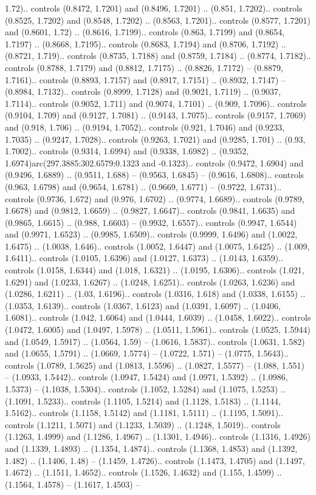 1.72).. controls (0.8472, 1.7201) and (0.8496, 1.7201) .. (0.851, 1.7202).. controls (0.8525, 1.7202) and (0.8548, 1.7202) .. (0.8563, 1.7201).. controls (0.8577, 1.7201) and (0.8601, 1.72) .. (0.8616, 1.7199).. controls (0.863, 1.7199) and (0.8654, 1.7197) .. (0.8668, 1.7195).. controls (0.8683, 1.7194) and (0.8706, 1.7192) .. (0.8721, 1.719).. controls (0.8735, 1.7188) and (0.8759, 1.7184) .. (0.8774, 1.7182).. controls (0.8788, 1.7179) and (0.8812, 1.7175) .. (0.8826, 1.7172) -- (0.8879, 1.7161).. controls (0.8893, 1.7157) and (0.8917, 1.7151) .. (0.8932, 1.7147) -- (0.8984, 1.7132).. controls (0.8999, 1.7128) and (0.9021, 1.7119) .. (0.9037, 1.7114).. controls (0.9052, 1.711) and (0.9074, 1.7101) .. (0.909, 1.7096).. controls (0.9104, 1.709) and (0.9127, 1.7081) .. (0.9143, 1.7075).. controls (0.9157, 1.7069) and (0.918, 1.706) .. (0.9194, 1.7052).. controls (0.921, 1.7046) and (0.9233, 1.7035) .. (0.9247, 1.7028).. controls (0.9263, 1.7021) and (0.9285, 1.701) .. (0.93, 1.7002).. controls (0.9314, 1.6994) and (0.9338, 1.6982) .. (0.9352, 1.6974)arc(297.3885:302.6579:0.1323 and -0.1323).. controls (0.9472, 1.6904) and (0.9496, 1.6889) .. (0.9511, 1.688) -- (0.9563, 1.6845) -- (0.9616, 1.6808).. controls (0.963, 1.6798) and (0.9654, 1.6781) .. (0.9669, 1.6771) -- (0.9722, 1.6731).. controls (0.9736, 1.672) and (0.976, 1.6702) .. (0.9774, 1.6689).. controls (0.9789, 1.6678) and (0.9812, 1.6659) .. (0.9827, 1.6647).. controls (0.9841, 1.6635) and (0.9865, 1.6615) .. (0.988, 1.6603) -- (0.9932, 1.6557).. controls (0.9947, 1.6544) and (0.9971, 1.6523) .. (0.9985, 1.6509).. controls (0.9999, 1.6496) and (1.0022, 1.6475) .. (1.0038, 1.646).. controls (1.0052, 1.6447) and (1.0075, 1.6425) .. (1.009, 1.6411).. controls (1.0105, 1.6396) and (1.0127, 1.6373) .. (1.0143, 1.6359).. controls (1.0158, 1.6344) and (1.018, 1.6321) .. (1.0195, 1.6306).. controls (1.021, 1.6291) and (1.0233, 1.6267) .. (1.0248, 1.6251).. controls (1.0263, 1.6236) and (1.0286, 1.6211) .. (1.03, 1.6196).. controls (1.0316, 1.618) and (1.0338, 1.6155) .. (1.0353, 1.6139).. controls (1.0367, 1.6123) and (1.0391, 1.6097) .. (1.0406, 1.6081).. controls (1.042, 1.6064) and (1.0444, 1.6039) .. (1.0458, 1.6022).. controls (1.0472, 1.6005) and (1.0497, 1.5978) .. (1.0511, 1.5961).. controls (1.0525, 1.5944) and (1.0549, 1.5917) .. (1.0564, 1.59) -- (1.0616, 1.5837).. controls (1.0631, 1.582) and (1.0655, 1.5791) .. (1.0669, 1.5774) -- (1.0722, 1.571) -- (1.0775, 1.5643).. controls (1.0789, 1.5625) and (1.0813, 1.5596) .. (1.0827, 1.5577) -- (1.088, 1.551) -- (1.0933, 1.5442).. controls (1.0947, 1.5424) and (1.0971, 1.5392) .. (1.0986, 1.5373) -- (1.1038, 1.5304).. controls (1.1052, 1.5284) and (1.1075, 1.5253) .. (1.1091, 1.5233).. controls (1.1105, 1.5214) and (1.1128, 1.5183) .. (1.1144, 1.5162).. controls (1.1158, 1.5142) and (1.1181, 1.5111) .. (1.1195, 1.5091).. controls (1.1211, 1.5071) and (1.1233, 1.5039) .. (1.1248, 1.5019).. controls (1.1263, 1.4999) and (1.1286, 1.4967) .. (1.1301, 1.4946).. controls (1.1316, 1.4926) and (1.1339, 1.4893) .. (1.1354, 1.4874).. controls (1.1368, 1.4853) and (1.1392, 1.482) .. (1.1406, 1.48) -- (1.1459, 1.4726).. controls (1.1473, 1.4705) and (1.1497, 1.4672) .. (1.1511, 1.4652).. controls (1.1526, 1.4632) and (1.155, 1.4599) .. (1.1564, 1.4578) -- (1.1617, 1.4503) -- 